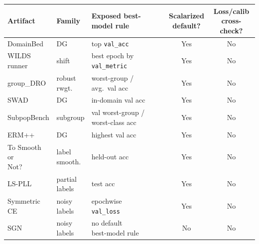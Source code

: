 \begin{tabular}{@{}p{1.75cm}p{1.25cm}p{3.55cm}cc@{}}
  \toprule
  Artifact & Family & Exposed best-model rule & \shortstack[c]{Scalarized\\default?} & \shortstack[c]{Loss/calib\\cross-check?} \\
  \midrule
  DomainBed & DG & top \texttt{val\_acc} & Yes & No \\
  \shortstack[l]{WILDS\\ runner} & shift & \shortstack[l]{best epoch by\\\texttt{val\_metric}} & Yes & No \\
  group\_DRO & \shortstack[l]{robust\\rwgt.} & \shortstack[l]{worst-group /\\avg.\ val acc} & Yes & No \\
  SWAD & DG & in-domain val acc & Yes & No \\
  SubpopBench & subgroup & \shortstack[l]{val worst-group /\\worst-class acc} & Yes & No \\
  ERM++ & DG & highest val acc & Yes & No \\
  \shortstack[l]{To Smooth or\\ Not?} & \shortstack[l]{label\\smooth.} & held-out acc & Yes & No \\
  LS-PLL & \shortstack[l]{partial\\labels} & test acc & Yes & No \\
  \shortstack[l]{Symmetric\\ CE} & \shortstack[l]{noisy\\labels} & \shortstack[l]{epochwise\\\texttt{val\_loss}} & Yes & No \\
  SGN & \shortstack[l]{noisy\\labels} & \shortstack[l]{no default\\best-model rule} & No & No \\
  \bottomrule
\end{tabular}
